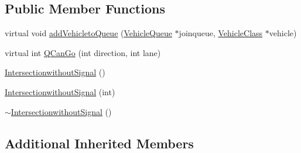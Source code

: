 \subsection*{Public Member Functions}
\begin{DoxyCompactItemize}
\item 
virtual void \hyperlink{class_intersectionwithout_signal_ab538d75fb2afe614867754e0debbd2e2}{add\-Vehicleto\-Queue} (\hyperlink{class_vehicle_queue}{Vehicle\-Queue} $\ast$joinqueue, \hyperlink{class_vehicle_class}{Vehicle\-Class} $\ast$vehicle)
\item 
virtual int \hyperlink{class_intersectionwithout_signal_ac003b0651a33eb53986c4b0389f2c788}{Q\-Can\-Go} (int direction, int lane)
\item 
\hyperlink{class_intersectionwithout_signal_a7c81c93bba932977e99b65eeb46eed9c}{Intersectionwithout\-Signal} ()
\item 
\hyperlink{class_intersectionwithout_signal_a7afe1b9d80f5424b5cb36448245b3453}{Intersectionwithout\-Signal} (int)
\item 
\hyperlink{class_intersectionwithout_signal_aefe421c50207cf3528e6a6338b90c7b6}{$\sim$\-Intersectionwithout\-Signal} ()
\end{DoxyCompactItemize}
\subsection*{Additional Inherited Members}


